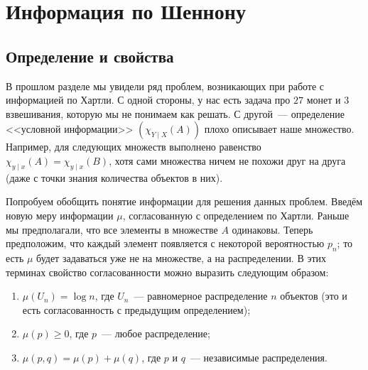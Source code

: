 \section{Информация по Шеннону}

\subsection{Определение и свойства}
В прошлом разделе мы увидели ряд проблем, возникающих при работе с информацией по Хартли. С одной
стороны, у нас есть задача про $27$ монет и $3$ взвешивания, которую мы не понимаем как решать. С
другой~--- определение <<условной информации>> $(\chi_{Y \mid X}(A))$ плохо описывает наше
множество. Например, для следующих множеств выполнено равенство
$\chi_{y \mid x}(A) = \chi_{y \mid x}(B)$, хотя сами множества ничем не похожи друг на друга (даже с
точки знания количества объектов в них).
\begin{figure}[h]
	\centering
	\begin{subfigure}[h]{0.4\textwidth}
        
		\caption{} 
	\end{subfigure}
	\qquad\qquad
	\begin{subfigure}[h]{0.4\textwidth}
        
		\caption{} 
	\end{subfigure}
\end{figure}

Попробуем обобщить понятие информации для решения данных проблем. Введём новую меру информации $\mu$,
согласованную с определением по Хартли. Раньше мы предполагали, что все элементы в множестве $A$
одинаковы. Теперь предположим, что каждый элемент появляется с некоторой вероятностью $p_n$; то есть
$\mu$ будет задаваться уже не на множестве, а на распределении. В этих терминах свойство согласованности
можно выразить следующим образом: 
\begin{enumerate}
    \item $\mu(U_n) = \log{n}$, где $U_n$~--- равномерное распределение $n$ объектов (это и есть
        согласованность с предыдущим определением);
    \item $\mu(p) \ge 0$, где $p$~--- любое распределение;
    \item $\mu(p, q) = \mu(p) + \mu(q)$, где $p$ и $q$~--- независимые  распределения.
\end{enumerate}

